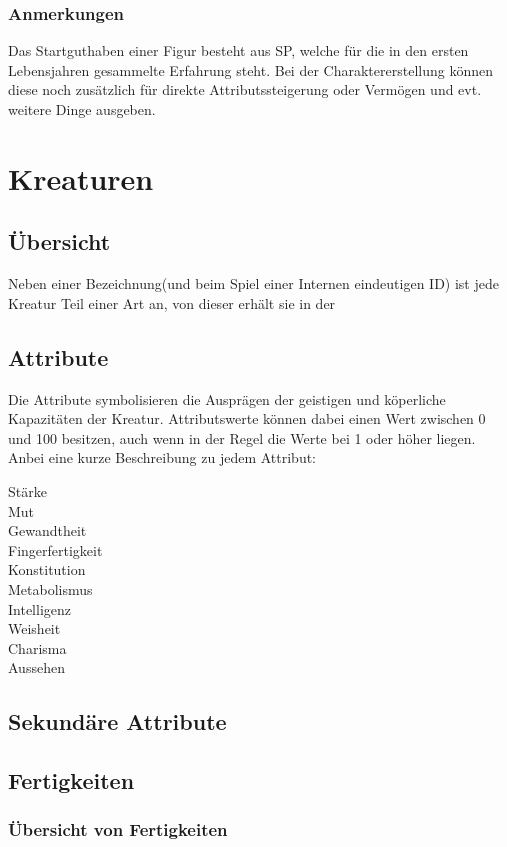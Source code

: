 \documentclass[a4paper,12pt,oneside]{book}
\begin{document}
\section{Anmerkungen}
Das Startguthaben einer Figur besteht aus SP, welche für die in den ersten Lebensjahren gesammelte Erfahrung steht. Bei der Charaktererstellung können diese noch zusätzlich für direkte Attributssteigerung oder Vermögen und evt. weitere Dinge ausgeben.

\part{Kreaturen}
\setcounter{chapter}{0}
\chapter{Übersicht}
Neben einer Bezeichnung(und beim Spiel einer Internen eindeutigen ID) ist jede Kreatur Teil einer Art an, von dieser erhält sie in der 
\chapter{Attribute}
Die Attribute symbolisieren die Ausprägen der geistigen und köperliche Kapazitäten der Kreatur. Attributswerte können dabei einen Wert zwischen 0 und 100 besitzen, auch wenn in der Regel die Werte bei 1 oder höher liegen. Anbei eine kurze Beschreibung zu jedem Attribut:
\begin{description}
\item[Stärke] 
\item[Mut]
\item[Gewandtheit]
\item[Fingerfertigkeit]
\item[Konstitution]
\item[Metabolismus]
\item[Intelligenz]
\item[Weisheit]
\item[Charisma]
\item[Aussehen]
\end{description}
\chapter{Sekundäre Attribute}
\chapter{Fertigkeiten}
\section{Übersicht von Fertigkeiten}
\end{document}
